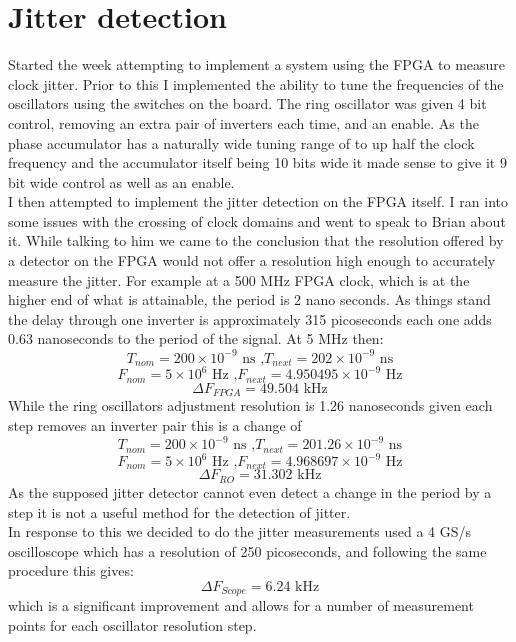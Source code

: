 \documentclass[a4paper,12pt]{report}
\begin{document}

\section*{Jitter detection}
Started the week attempting to implement a system using the FPGA to measure clock jitter. Prior to this I implemented the ability to tune the frequencies of the oscillators using the switches on the board. The ring oscillator was given 4 bit control, removing an extra pair of inverters each time, and an enable. As the phase accumulator has a naturally wide tuning range of to up half the clock frequency and the accumulator itself being 10 bits wide it made sense to give it 9 bit wide control as well as an enable.\\

I then attempted to implement the jitter detection on the FPGA itself. I ran into some issues with the crossing of clock domains and went to speak to Brian about it. While talking to him we came to the conclusion that the resolution offered by a detector on the FPGA would not offer a resolution high enough to accurately measure the jitter. For example at a 500 MHz FPGA clock, which is at the higher end of what is attainable, the period is 2 nano seconds. As things stand the delay through one inverter is approximately 315 picoseconds each one adds 0.63 nanoseconds to the period of the signal. At 5 MHz then:
$$ T_{nom} = 200\times10^{-9}\text{ ns ,}T_{next} = 202\times10^{-9}\text{ ns} $$
$$ F_{nom} = 5\times10^{6}\text{ Hz ,}F_{next} = 4.950495\times10^{-9}\text{ Hz} $$
$$ \Delta F_{FPGA} = 49.504\text{ kHz} $$
While the ring oscillators adjustment resolution is 1.26 nanoseconds given each step removes an inverter pair this is a change of 
$$ T_{nom} = 200\times10^{-9}\text{ ns ,}T_{next} = 201.26\times10^{-9}\text{ ns} $$
$$ F_{nom} = 5\times10^{6}\text{ Hz ,}F_{next} = 4.968697\times10^{-9}\text{ Hz} $$
$$ \Delta F_{RO} = 31.302\text{ kHz} $$
As the supposed jitter detector cannot even detect a change in the period by a step it is not a useful method for the detection of jitter.\\
In response to this we decided to do the jitter measurements used a 4 GS/s oscilloscope which has a resolution of 250 picoseconds, and following the same procedure this gives:
$$ \Delta F_{Scope} = 6.24\text{ kHz} $$
which is a significant improvement and allows for a number of measurement points for each oscillator resolution step.\\
\end{document}
